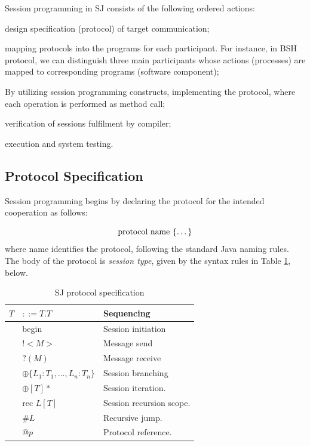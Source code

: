 \documentclass{llncs}
\begin{document}
Session programming in SJ consists of the following ordered actions:

\begin{compactenum}
  \item design specification (protocol) of target communication;
  \item mapping protocols into the programs for each participant. For instance, in BSH protocol, we can distinguish three main participants whose actions (processes) are mapped to corresponding programs (software component);
  \item By utilizing session programming constructs, implementing the protocol, where each operation is performed as method call;
  \item verification of sessions fulfilment by  compiler;
  \item execution and system testing.
\end{compactenum}

\subsection{Protocol Specification}
Session programming begins by declaring the protocol for the intended cooperation as follows:

\begin{equation*}
\text{protocol name \{\dots\}}
\end{equation*}
where name identifies the protocol, following the standard Java naming rules. The body of the protocol is \textit{session type}, given by the syntax rules in Table \ref{tab:prot-spec}, below.

\begin{longtable}{|p{}|p{}|p{}|}
\caption{SJ protocol specification}\label{tab:prot-spec} \\
\hline
$T$ & $::=T.T$ & Sequencing \\ \hline
& begin & Session initiation \\ \hline
& $!<M>$ & Message send \\ \hline 
& $?(M)$ & Message receive \\ \hline
& $\oplus \{L_1:T_1,\dots, L_n:T_n \}$ & Session branching \\ \hline
& $\oplus [T]*$ & Session iteration. \\ \hline 
& $\text{rec }L[T]$ & Session recursion scope. \\ \hline
& \#$L$ & Recursive jump. \\ \hline
& @$p$ & Protocol reference. \\ \hline
\end{longtable}
\end{document}
